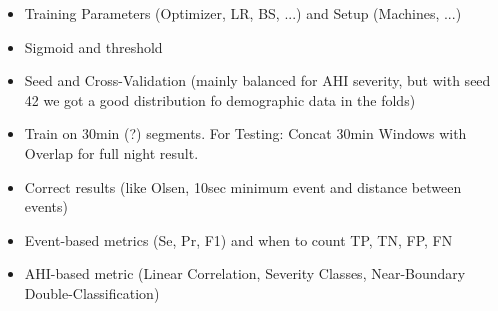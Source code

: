 \begin{itemize}
    \item Training Parameters (Optimizer, LR, BS, ...) and Setup (Machines, ...)
    \item Sigmoid and threshold
    \item Seed and Cross-Validation (mainly balanced for AHI severity, but with seed 42 we got a good distribution fo demographic data in the folds)
    \item Train on 30min (?) segments. For Testing: Concat 30min Windows with Overlap for full night result.
    \item Correct results (like Olsen, 10sec minimum event and distance between events)
    \item Event-based metrics (Se, Pr, F1) and when to count TP, TN, FP, FN
    \item AHI-based metric (Linear Correlation, Severity Classes, Near-Boundary Double-Classification)
\end{itemize}

